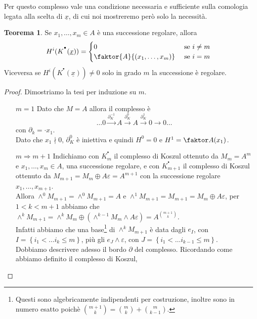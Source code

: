 \documentclass[a4paper,11pt,oneside]{book}
\newcommand{\set}[1]{\left\{ #1 \right\}}
\newcommand{\complx}[1]{#1^{^\bullet}}
\theoremstyle{definition}
\newtheorem{teo}[section]{Teorema}
\begin{document}
    Per questo complesso vale una condizione necessaria e sufficiente sulla comologia legata alla scelta di $\underline{x}$,
    di cui noi mostreremo però solo la necessità.
    \begin{teo}\label{teo:koszul}
     Se $x_1,\dots,x_m\in A$ è una successione regolare, allora 
     \[
      H^i(\complx K (\underline x))=
      \begin{cases}
       0 & \text{ se } i\neq m \\
       \faktor{A}{(x_1,\dots, x_m)}& \text{ se } i= m \\
      \end{cases}
     \]
    Viceversa se $H^i(\complx K (\underline x))\neq0$ solo in grado $m$ la successione è regolare.
    \end{teo}
    
    \begin{proof}
    Dimostriamo la tesi per induzione su $m$.
    \begin{itemize}
     \item [$m=1$] Dato che $M=A$ allora il complesso è
	    \[
	    \dots 0 \xrightarrow{\partial_K^{-1}} A \xrightarrow{\partial_K^{0}} A \xrightarrow{\partial_K^{1}} 0
	    \rightarrow 0\dots
	    \]
	    con $\partial_k=\cdot x_1$.\\ Dato che $x_1\nmid 0$,  $\partial_K^0$ è iniettiva e quindi
	    $H^0=0$ e $H^1=\faktor A {(x_1)}$.
     \item [$m\Rightarrow m+1$] Indichiamo con $\complx{K}_m$ il complesso di Koszul ottenuto da $M_m=A^m$ e
	     $x_1,\dots,x_m\in A$, una successione regolare, e con $\complx{K}_{m+1}$ il complesso di Koszul
	     ottenuto da $M_{m+1}=M_m\oplus A\varepsilon=A^{m+1}$ con la successione regolare $x_1,\dots,x_{m+1}$.\\
	     Allora $\wedge^0M_{m+1}=\wedge^0M_{m+1}=A$ e $\wedge^1M_{m+1}=M_{m+1}=M_m\oplus A\varepsilon$,
	     per $1<k<m+1$ abbiamo che 
	     $\wedge^kM_{m+1}=\wedge^kM_{m}\oplus (\wedge^{k-1}M_{m}\wedge  A\varepsilon)=A^{m+1 \choose k}$.\\
	     Infatti abbiamo che una base\footnote{Questi sono algebricamente indipendenti
	     per costruzione, inoltre sono in numero esatto poichè ${m+1 \choose k}={m\choose k}+{m\choose k-1}$.}
	     di  $\wedge^kM_{m+1}$ è data dagli $e_I$, con $I=\set{i_1<\dots i_k\leq m}$, più gli $e_J\wedge\varepsilon$, con $J=\set{i_1<\dots i_{k-1}\leq m}$. \\
	     Dobbiamo descrivere adesso il bordo $\partial$ del complesso. Ricordando come abbiamo definito il complesso di Koszul,

\end{itemize}
\end{proof}
\end{document}
